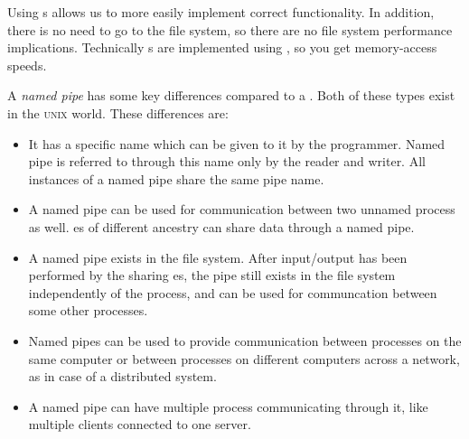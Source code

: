Using s allows us to more easily implement correct  functionality.
In addition, there is no need to go to the file system, so there are no file system performance implications.
Technically s are implemented using , so you get memory-access speeds.

\begin{definition}\label{def:Named_Pipe}
  A \emph{named pipe} has some key differences compared to a .
  Both of these types exist in the \textsc{unix} world.
  These differences are:
  \begin{itemize}[noitemsep]
  \item It has a specific name which can be given to it by the programmer.
    Named pipe is referred to through this name only by the reader and writer.
    All instances of a named pipe share the same pipe name.
  \item A named pipe can be used for communication between two unnamed process as well.
    es of different ancestry can share data through a named pipe.
  \item A named pipe exists in the file system.
    After input/output has been performed by the sharing es, the pipe still exists in the file system independently of the process, and can be used for communcation between some other processes.
  \item Named pipes can be used to provide communication between processes on the same computer or between processes on different computers across a network, as in case of a distributed system.
  \item A named pipe can have multiple process communicating through it, like multiple clients connected to one server.
  \end{itemize}
\end{definition}

